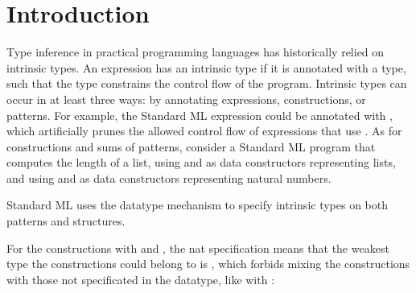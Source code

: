 \documentclass[table,dvipsnames,acmsmall]{acmart}
\theoremstyle{definition}
\begin{document}





\section{Introduction}
\label{sec:introduction}

Type inference in practical programming languages has historically relied on intrinsic types.
An expression has an intrinsic type if it is annotated with a type, such that the type
constrains the control flow of the program.  
Intrinsic types can occur in at least three ways: by annotating
expressions, constructions, or patterns.     
For example, the Standard ML expression 
could be annotated with ,
which artificially prunes the allowed control flow of expressions that use .
As for constructions and sums of patterns, consider a Standard ML program that computes the length of a list,
using  and  as data constructors representing lists, 
and using  and  as data constructors representing natural numbers.


\noindent
Standard ML uses the datatype mechanism to specify intrinsic types on both patterns and structures.


\noindent
For the constructions with  and , the nat specification 
means that the weakest type the constructions could belong to is ,
which forbids mixing the constructions with those not specificated in the datatype, like  with : 
\end{document}
